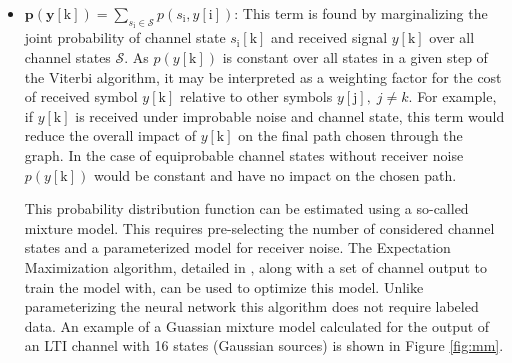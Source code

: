 \begin{itemize}
\item $\mathbf{p(y[\mathrm{k}])} = \sum_{s_{\mathrm{i}} \in \textit{$\mathcal{S}$}}p(s_{\mathrm{i}},y[\mathrm{i}])$: This term is found by marginalizing the joint probability of channel state $s_{\mathrm{i}}[\mathrm{k}]$ and received signal $y[\mathrm{k}]$ over all channel states $\mathcal{S}$. As $p(y[\mathrm{k}])$ is constant over all states in a given step of the Viterbi algorithm, it may be interpreted as a weighting factor for the cost of received symbol $y[\mathrm{k}]$ relative to other symbols $y[\mathrm{j}], \; j\neq k$. For example, if $y[\mathrm{k}]$ is received under improbable noise and channel state, this term would reduce the overall impact of $y[\mathrm{k}]$ on the final path chosen through the graph. In the case of equiprobable channel states without receiver noise $p(y[\mathrm{k}])$ would be constant and have no impact on the chosen path.
\par
This probability distribution function can be estimated using a so-called mixture model. This requires pre-selecting the number of considered channel states and a parameterized model for receiver noise. The Expectation Maximization algorithm, detailed in \cite{ng2000cs229}, along with a set of channel output to train the model with, can be used to optimize this model. Unlike parameterizing the neural network this algorithm does not require labeled data. An example of a Guassian mixture model calculated for the output of an LTI channel with 16 states (Gaussian sources) is shown in Figure \ref{fig:mm}. 
%
%



\end{itemize}
